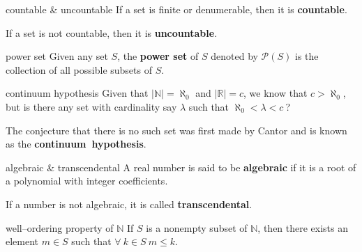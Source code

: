 \documentclass[avery5371,grid]{flashcards}
\newcommand{\N}{\mathbb{N}}
\newcommand{\R}{\mathbb{R}}
\begin{document}
\begin{flashcard}[Definition]{countable \& uncountable}
If a set is finite or denumerable, then it is \mbox{\textbf{countable}}.

\bigskip
If a set is not countable, then it is \mbox{\textbf{uncountable}}.
\end{flashcard}

\begin{flashcard}[Definition]{power set}
Given any set $S$, the \textbf{power set} of $S$ denoted by
$\mathscr{P}(S)$ is the collection of all possible subsets of $S$.
\end{flashcard}

\begin{flashcard}[Definition]{continuum hypothesis}
Given that $|\N| = \aleph_{0}$ and $|\R| = c$, we know
that $c > \aleph_{0}$, but is there any set with cardinality say $\lambda$
such that $\aleph_{0} < \lambda < c \ $?

\bigskip
The conjecture that there is no such set was first made by Cantor and is
known as the \mbox{\textbf{continuum hypothesis}}.
\end{flashcard}

\begin{flashcard}[Definition]{algebraic \& transcendental}
A real number is said to be \textbf{algebraic} if it is a root of a 
polynomial with integer coefficients.

\bigskip
If a number is not algebraic, it is called \textbf{transcendental}.
\end{flashcard}


\begin{flashcard}[Axiom]{well--ordering property of $\N$}
If $S$ is a nonempty subset of $\N$, then there exists an element
$m \in S$ such that $ \forall \ k \in S \ m \leq k$.
\end{flashcard}
\end{document}
